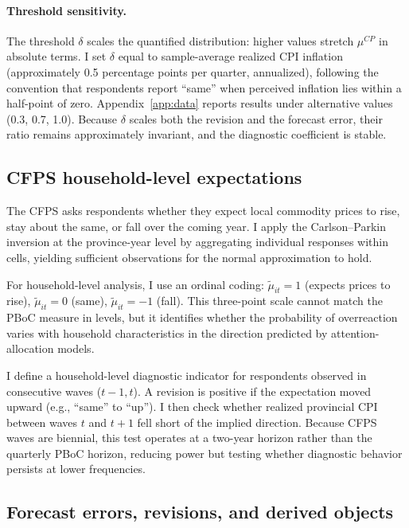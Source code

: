\paragraph{Threshold sensitivity.}
The threshold $\delta$ scales the quantified distribution:
higher values stretch $\mu^{CP}$ in absolute terms. I set
$\delta$ equal to sample-average realized CPI inflation
(approximately 0.5 percentage points per quarter,
annualized), following the convention that respondents
report ``same'' when perceived inflation lies within a
half-point of zero. Appendix~\ref{app:data} reports
results under alternative values (0.3, 0.7, 1.0). Because
$\delta$ scales both the revision and the forecast error,
their ratio remains approximately invariant, and the
diagnostic coefficient is stable.

\subsection{CFPS household-level expectations}

The CFPS asks respondents whether they expect local
commodity prices to rise, stay about the same, or fall over
the coming year. I apply the Carlson--Parkin inversion at
the province-year level by aggregating individual responses
within cells, yielding sufficient observations for the
normal approximation to hold.

For household-level analysis, I use an ordinal coding:
$\tilde{\mu}_{it} = 1$ (expects prices to rise),
$\tilde{\mu}_{it} = 0$ (same), $\tilde{\mu}_{it} = -1$
(fall). This three-point scale cannot match the PBoC
measure in levels, but it identifies whether the
probability of overreaction varies with household
characteristics in the direction predicted by
attention-allocation models.

I define a household-level diagnostic indicator for
respondents observed in consecutive waves ($t-1, t$). A
revision is positive if the expectation moved upward (e.g.,
``same'' to ``up''). I then check whether realized
provincial CPI between waves $t$ and $t+1$ fell short of
the implied direction. Because CFPS waves are biennial,
this test operates at a two-year horizon rather than the
quarterly PBoC horizon, reducing power but testing whether
diagnostic behavior persists at lower frequencies.

\subsection{Forecast errors, revisions, and derived objects}

